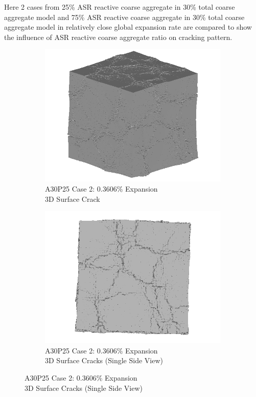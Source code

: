 Here 2 cases from 25\% ASR reactive coarse aggregate in 30\% total coarse aggregate model and 75\% ASR reactive coarse aggregate in 30\% total coarse aggregate model in relatively close global expansion rate are compared to show the influence of ASR reactive coarse aggregate ratio on cracking pattern.

\begin{figure}[ht!]
\centering

    \begin{subfigure}{.5\textwidth}
      \centering
      \includegraphics[width=.8\linewidth]{Files/exp_3D/ASR/A30P25_2_3d.png}
    \caption{A30P25 Case 2: 0.3606\% Expansion \\ 3D Surface Crack}
    \end{subfigure}%
    \begin{subfigure}{.5\textwidth}
      \centering
      \includegraphics[width=.8\linewidth]{Files/exp_3D/ASR/A30P25_2_3ds.png}
    \caption{A30P25 Case 2: 0.3606\% Expansion \\ 3D Surface Cracks (Single Side View)}

\end{subfigure}
\end{figure}
